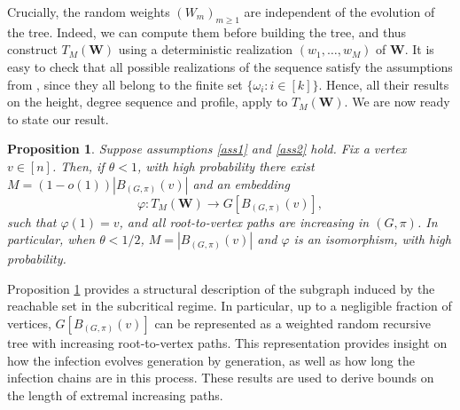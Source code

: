 \documentclass[11pt]{article}
\numberwithin{equation}{section}
\newtheorem{proposition}[theorem]{Proposition}
\theoremstyle{definition}
\begin{document}


Crucially, the random weights $(W_m)_{m\geq 1}$ are independent of the evolution of the tree. Indeed, we can compute them before building the tree, and thus construct $T_M(\boldsymbol{W})$ using a deterministic realization $(w_1,\ldots,w_M)$ of $\boldsymbol{W}$. It is easy to check that all possible realizations of the sequence satisfy the assumptions from \cite{S18}, since they all belong to the finite set $\{\omega_i : i\in[k]\}$. Hence, all their results on the height, degree sequence and profile, apply to $T_M(\boldsymbol{W})$. We are now ready to state our result.


\begin{proposition}
\label{proposition_subcritical_structure}
    Suppose assumptions \ref{ass1} and \ref{ass2} hold. Fix a vertex $v\in[n]$. Then, if $\theta < 1$, with high probability there exist $M=(1-o(1))|B_{(G,\pi)}(v)|$ and an embedding 
    $$\varphi : T_M(\boldsymbol{W}) \to G[B_{(G,\pi)}(v)], $$
    such that $\varphi(1)=v$, and all root-to-vertex paths are increasing in $(G,\pi)$. In particular, when $\theta < 1/2$, $M=|B_{(G,\pi)}(v)|$ and $\varphi$ is an isomorphism, with high probability. 
\end{proposition}

Proposition \ref{proposition_subcritical_structure} provides a structural description of the subgraph induced by the reachable set in the subcritical regime. In particular, up to a negligible fraction of vertices, $G[B_{(G,\pi)}(v)]$ can be represented as a weighted random recursive tree with increasing root-to-vertex paths. This representation provides insight on how the infection evolves generation by generation, as well as how long the infection chains are in this process. These results are used to derive bounds on the length of extremal increasing paths. 
\end{document}
